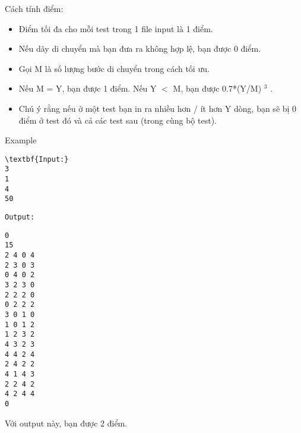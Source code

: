 Cách tính điểm:
\begin{itemize}
	\item     Điểm tối đa cho mỗi test trong 1 file input là 1 điểm.   
	\item     Nếu dãy di chuyển mà bạn đưa ra không hợp lệ, bạn được 0 điểm.   
	\item     Gọi M là số lượng bước di chuyển trong cách tối ưu.   
	\item     Nếu M = Y, bạn được 1 điểm. Nếu Y $<$ M, bạn được 0.7*(Y/M)    $^     3    $    .   
	\item     Chú ý rằng nếu ở một test bạn in ra nhiều hơn / ít hơn Y dòng, bạn sẽ bị 0 điểm ở test đó và cả các test sau (trong cùng bộ test).   
\end{itemize}
Example
\begin{verbatim}
\textbf{Input:}
3
1
4
50
\end{verbatim}
\begin{verbatim}
Output:\end{verbatim}
\begin{verbatim}
0
15
2 4 0 4
2 3 0 3
0 4 0 2
3 2 3 0
2 2 2 0
0 2 2 2
3 0 1 0
1 0 1 2
1 2 3 2
4 3 2 3
4 4 2 4
2 4 2 2
4 1 4 3
2 2 4 2
4 2 4 4
0
\end{verbatim}

   Với output này, bạn được 2 điểm.